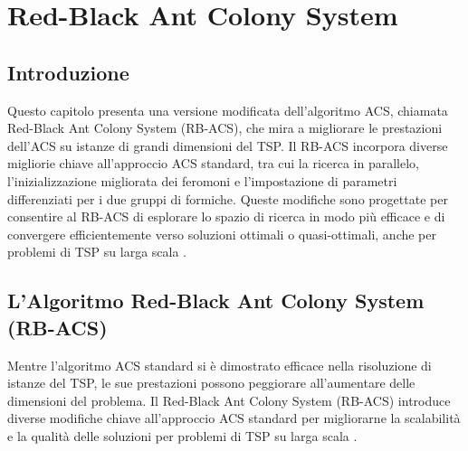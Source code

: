
%

\chapter{Red-Black Ant Colony System}
\label{chapt:6}

\section{Introduzione}

Questo capitolo presenta una versione modificata dell'algoritmo \Gls{ACS}, chiamata Red-Black Ant Colony System (\Gls{RB-ACS}), che mira a migliorare le prestazioni dell'\Gls{ACS} su istanze di grandi dimensioni del \Gls{TSP}. Il \Gls{RB-ACS} incorpora diverse migliorie chiave all'approccio  \Gls{ACS} standard, tra cui la ricerca in parallelo, l'inizializzazione migliorata dei feromoni e l'impostazione di parametri differenziati per i due gruppi di formiche. Queste modifiche sono progettate per consentire al \Gls{RB-ACS} di esplorare lo spazio di ricerca in modo più efficace e di convergere efficientemente verso soluzioni ottimali o quasi-ottimali, anche per problemi di \Gls{TSP} su larga scala \cite{Hassan2013}.

\section{L'Algoritmo Red-Black Ant Colony System (\Gls{RB-ACS})}
Mentre l'algoritmo  \Gls{ACS} standard si è dimostrato efficace nella risoluzione di istanze del \Gls{TSP}, le sue prestazioni possono peggiorare all'aumentare delle dimensioni del problema. Il Red-Black Ant Colony System (\Gls{RB-ACS})  introduce diverse modifiche chiave all'approccio  \Gls{ACS} standard per migliorarne la scalabilità e la qualità delle soluzioni per problemi di \Gls{TSP} su larga scala \cite{Hassan2013}.

